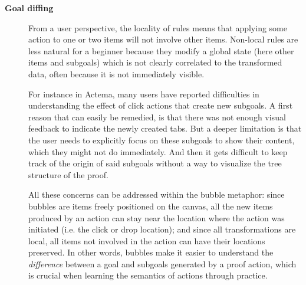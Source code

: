 \begin{description}
  \item[\textbf{Goal diffing}] From a user perspective, the locality of rules
    means that applying some action to one or two items will not involve other
    items.
    Non-local rules are less natural for a beginner because they modify a global
    state (here other items and subgoals) which is not clearly correlated to the
    transformed data, often because it is not immediately visible.

    For instance in Actema, many users have reported difficulties in
    understanding the effect of click actions that create new subgoals. A first
    reason that can easily be remedied, is that there was not enough visual
    feedback to indicate the newly created tabs. But a deeper limitation is that
    the user needs to explicitly focus on these subgoals to show their content,
    which they might not do immediately. And then it gets difficult to keep
    track of the origin of said subgoals without a way to visualize the tree
    structure of the proof.

    All these concerns can be addressed within the bubble metaphor: since
    bubbles are items freely positioned on the canvas, all the new items
    produced by an action can stay near the location where the action was
    initiated (i.e. the click or drop location); and since all transformations
    are local, all items not involved in the action can have their locations
    preserved. In other words, bubbles make it easier to understand the
    \emph{difference} between a goal and subgoals generated by a proof action,
    which is crucial when learning the semantics of actions through practice.
\end{description}
